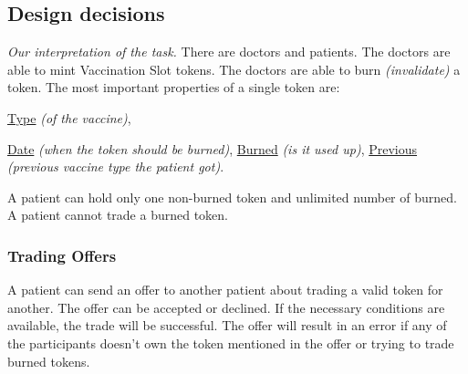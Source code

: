 \newcommand{\function}[4]{
  \textbf{#1}%
  (\emph{#2}):
  #3 \newline
  \emph{\color{teal} #4}
}

\newcommand{\gopkg}[2]{
  \href{https://pkg.go.dev/github.com/perryd01/vaccination-slot/chaincode#1}{#2}%
}

\newcommand{\testStruct}[3]{
  \subsubsection{#1}
  \paragraph*{Steps}
  \begin{enumerate}
    #2
  \end{enumerate}
  \textbf{Expected outcome:} #3
}

\newcommand{\vsType}[0]{\gopkg{\#VaccinationType}{Type}}
\newcommand{\vsDate}[0]{\gopkg{\#VaccinationDate}{Date}}


\subsection{Design decisions}
\emph{Our interpretation of the task.} There are doctors and patients. The doctors are able to mint Vaccination Slot tokens. The doctors are able to burn \emph{(invalidate)} a token. The most important properties of a single token are:%
\vsType \emph{(of the vaccine)},
\vsDate \emph{(when the token should be burned)},
\href{https://pkg.go.dev/github.com/perryd01/vaccination-slot/chaincode\#VaccinationDate}{Burned} \emph{(is it used up)},
\href{https://pkg.go.dev/github.com/perryd01/vaccination-slot/chaincode\#VaccinationSlotData}{Previous} \emph{(previous vaccine type the patient got)}.

A patient can hold only one non-burned token and unlimited number of burned. A patient cannot trade a burned token.

\subsubsection{Trading Offers}
A patient can send an offer to another patient about trading a valid token for another. The offer can be accepted or declined. If the necessary conditions are available, the trade will be successful.
The offer will result in an error if any of the participants doesn't own the token mentioned in the offer or trying to trade burned tokens.

